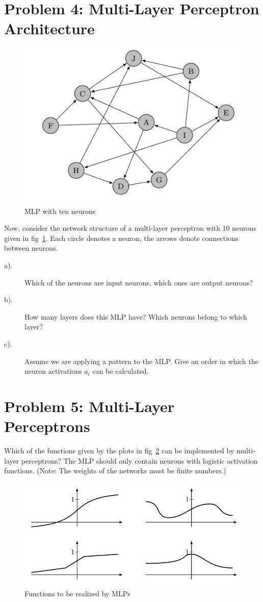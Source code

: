 \documentclass[12pt]{article}
\begin{document}
\section{Problem 4: Multi-Layer Perceptron Architecture}

\begin{figure}[!htbp]
	\centering
	\includegraphics[width=.55\textwidth]{fig/2018-03-19-13-54-31.png}
	\caption{MLP with ten neurons} \label{fig:mlp2} 
\end{figure}

Now, consider the network structure of a multi-layer perceptron with 10 neurons given in
fig~\ref{fig:mlp2}. Each circle denotes a neuron, the arrows denote connections between neurons.
\begin{description}
	\item[a).]  Which of the neurons are input neurons, which ones are output neurons?
	\item[b).] How many layers does this MLP have? Which neurons belong to which layer?
	\item[c).] Assume we are applying a pattern to the MLP. Give an order in which the neuron
	activations $a_i$ can be calculated.
\end{description}

\section{Problem 5: Multi-Layer Perceptrons}

Which of the functions given by the plots in fig~\ref{fig:mlp3} can be implemented by multi-layer
perceptrons? The MLP should only contain neurons with logistic activation functions.
(Note: The weights of the networks must be finite numbers.)

\begin{figure}
	\centering 

\includegraphics[width=.75\textwidth]{fig/2018-03-19-13-57-32.png}
\caption{Functions to be realized by MLPs} \label{fig:mlp3} 
\end{figure}
\end{document}

